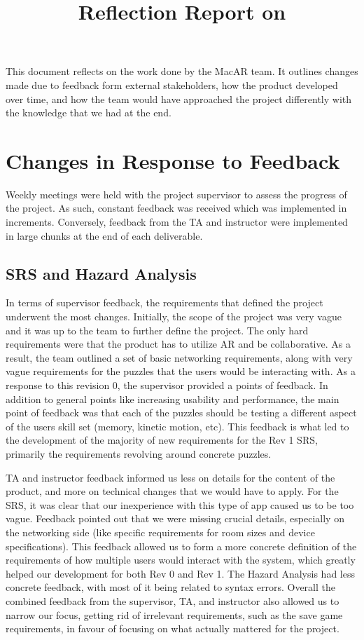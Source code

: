 \documentclass{article}
\title{Reflection Report on \progname}
\author{\authname}
\date{}
\begin{document}
\maketitle

This document reflects on the work done by the MacAR team. It outlines changes made due to feedback form external stakeholders, how the product developed over time, and how the team would have approached the project differently with the knowledge that we had at the end.

\section{Changes in Response to Feedback}

Weekly meetings were held with the project supervisor to assess the progress of the project. As such, constant feedback was received which was implemented in increments. Conversely, feedback from the TA and instructor were implemented in large chunks at the end of each deliverable. 

\subsection{SRS and Hazard Analysis}

In terms of supervisor feedback, the requirements that defined the project underwent the most changes. Initially, the scope of the project was very vague and it was up to the team to further define the project. The only hard requirements were that the product has to utilize AR and be collaborative. As a result, the team outlined a set of basic networking requirements, along with very vague requirements for the puzzles that the users would be interacting with. As a response to this revision 0, the supervisor provided a points of feedback. In addition to general points like increasing usability and performance, the main point of feedback was that each of the puzzles should be testing a different aspect of the users skill set (memory, kinetic motion, etc). This feedback is what led to the development of the majority of new requirements for the Rev 1 SRS, primarily the requirements revolving around concrete puzzles. 

TA and instructor feedback informed us less on details for the content of the product, and more on technical changes that we would have to apply. For the SRS, it was clear that our inexperience with this type of app caused us to be too vague. Feedback pointed out that we were missing crucial details, especially on the networking side (like specific requirements for room sizes and device specifications). This feedback allowed us to form a more concrete definition of the requirements of how multiple users would interact with the system, which greatly helped our development for both Rev 0 and Rev 1. The Hazard Analysis had less concrete feedback, with most of it being related to syntax errors. Overall the combined feedback from the supervisor, TA, and instructor also allowed us to narrow our focus, getting rid of irrelevant requirements, such as the save game requirements, in favour of focusing on what actually mattered for the project.
\end{document}
